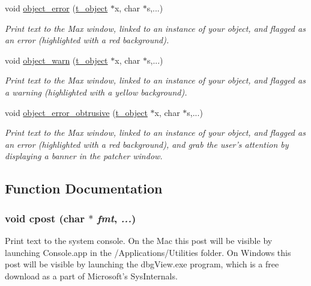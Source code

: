 \begin{DoxyCompactItemize}
void \hyperlink{group__console_ga05f7fed66fafc6e4d2e372b7f0fe4e43}{object\_\-error} (\hyperlink{structt__object}{t\_\-object} $\ast$x, char $\ast$s,...)
\begin{DoxyCompactList}\small\item\em Print text to the Max window, linked to an instance of your object, and flagged as an error (highlighted with a red background). \item\end{DoxyCompactList}\item 
void \hyperlink{group__console_ga7ab11c5e9e345384ad282fcd5b86275c}{object\_\-warn} (\hyperlink{structt__object}{t\_\-object} $\ast$x, char $\ast$s,...)
\begin{DoxyCompactList}\small\item\em Print text to the Max window, linked to an instance of your object, and flagged as a warning (highlighted with a yellow background). \item\end{DoxyCompactList}\item 
void \hyperlink{group__console_ga42a612b12b1a24380a45ab1b9278b950}{object\_\-error\_\-obtrusive} (\hyperlink{structt__object}{t\_\-object} $\ast$x, char $\ast$s,...)
\begin{DoxyCompactList}\small\item\em Print text to the Max window, linked to an instance of your object, and flagged as an error (highlighted with a red background), and grab the user's attention by displaying a banner in the patcher window. \item\end{DoxyCompactList}\end{DoxyCompactItemize}


\subsection{Function Documentation}
\hypertarget{group__console_ga94fff7e4ee19b8db6904a009117e0667}{
\subsubsection[{cpost}]{\setlength{\rightskip}{0pt plus 5cm}void cpost (char $\ast$ {\em fmt}, \/   {\em ...})}}
\label{group__console_ga94fff7e4ee19b8db6904a009117e0667}


Print text to the system console. On the Mac this post will be visible by launching Console.app in the /Applications/Utilities folder. On Windows this post will be visible by launching the dbgView.exe program, which is a free download as a part of Microsoft's SysInternals.


